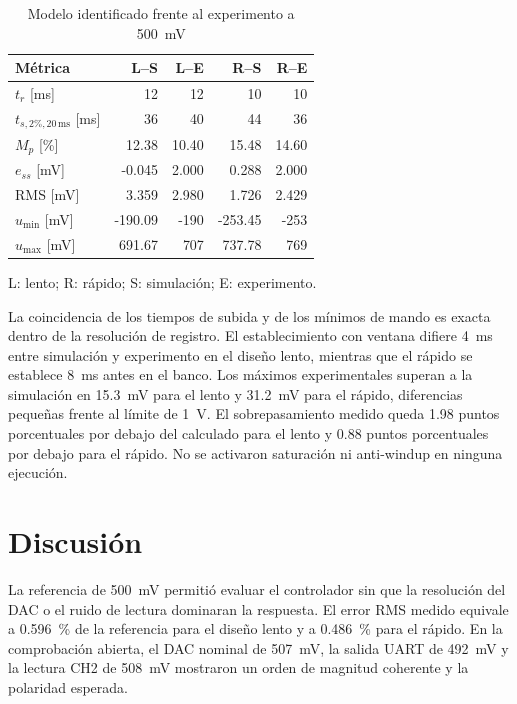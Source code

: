 \documentclass[conference]{IEEEtran}
\begin{document}
\begin{table}[!t]
\caption{Modelo identificado frente al experimento a \SI{500}{mV}}
\label{tab:sim-exp}
\centering
\scriptsize
\begin{tabular}{lrrrr}
\toprule
Métrica & L--S & L--E & R--S & R--E\\
\midrule
$t_r$ [ms] & 12 & 12 & 10 & 10\\
$t_{s,2\%,20\,\mathrm{ms}}$ [ms] & 36 & 40 & 44 & 36\\
$M_p$ [\%] & 12.38 & 10.40 & 15.48 & 14.60\\
$e_{ss}$ [mV] & -0.045 & 2.000 & 0.288 & 2.000\\
RMS [mV] & 3.359 & 2.980 & 1.726 & 2.429\\
$u_{\min}$ [mV] & -190.09 & -190 & -253.45 & -253\\
$u_{\max}$ [mV] & 691.67 & 707 & 737.78 & 769\\
\bottomrule
\end{tabular}
\begin{flushleft}
\scriptsize L: lento; R: rápido; S: simulación; E: experimento.
\end{flushleft}
\end{table}

La coincidencia de los tiempos de subida y de los mínimos de mando es exacta dentro de la resolución de registro. El establecimiento con ventana difiere \SI{4}{ms} entre simulación y experimento en el diseño lento, mientras que el rápido se establece \SI{8}{ms} antes en el banco. Los máximos experimentales superan a la simulación en \SI{15.3}{mV} para el lento y \SI{31.2}{mV} para el rápido, diferencias pequeñas frente al límite de \SI{1}{V}. El sobrepasamiento medido queda \num{1.98} puntos porcentuales por debajo del calculado para el lento y \num{0.88} puntos porcentuales por debajo para el rápido. No se activaron saturación ni anti-windup en ninguna ejecución.

\section{Discusión}
La referencia de \SI{500}{mV} permitió evaluar el controlador sin que la resolución del DAC o el ruido de lectura dominaran la respuesta. El error RMS medido equivale a \SI{0.596}{\percent} de la referencia para el diseño lento y a \SI{0.486}{\percent} para el rápido. En la comprobación abierta, el DAC nominal de \SI{507}{mV}, la salida UART de \SI{492}{mV} y la lectura CH2 de \SI{508}{mV} mostraron un orden de magnitud coherente y la polaridad esperada.
\end{document}

